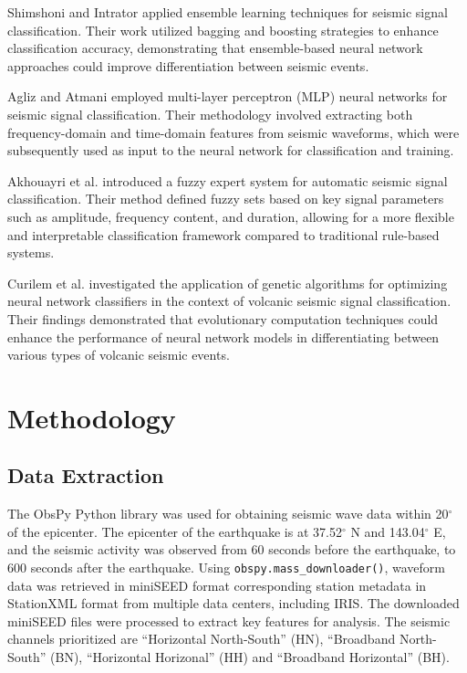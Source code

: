\documentclass[conference]{IEEEtran}
\begin{document}
Shimshoni and Intrator \cite{b7} applied
ensemble learning techniques for seismic signal classification. Their work
utilized bagging and boosting strategies to enhance classification accuracy,
demonstrating that ensemble-based neural network approaches could improve
differentiation between seismic events.


Agliz and Atmani \cite{b8} employed
multi-layer perceptron (MLP) neural networks for seismic signal classification.
Their methodology involved extracting both frequency-domain and time-domain
features from seismic waveforms, which were subsequently used as input to the
neural network for classification and training.


Akhouayri et al. \cite{b9}
introduced a fuzzy expert system for automatic seismic signal classification.
Their method defined fuzzy sets based on key signal parameters such as
amplitude, frequency content, and duration, allowing for a more flexible and
interpretable classification framework compared to traditional rule-based
systems.


Curilem et al. \cite{b10} investigated the application of genetic
algorithms for optimizing neural network classifiers in the context of volcanic
seismic signal classification. Their findings demonstrated that evolutionary
computation techniques could enhance the performance of neural network models in
differentiating between various types of volcanic seismic events.
\section{Methodology}
\label{sec:org78fd3e6}
\subsection{Data Extraction}
\label{sec:org4053090}
The ObsPy Python library was used for obtaining seismic wave data within
20\(^{\circ}\) of the epicenter. The epicenter of the earthquake is at
37.52\(^{\circ}\) N and 143.04\(^{\circ}\) E, and the seismic activity was
observed from 60 seconds before the earthquake, to 600 seconds after the
earthquake. Using \texttt{obspy.mass\_downloader()}, waveform data was retrieved
in miniSEED format corresponding station metadata in StationXML format from
multiple data centers, including IRIS. The downloaded miniSEED files were
processed to extract key features for analysis. The seismic channels prioritized
are ``Horizontal North-South'' (HN), ``Broadband North-South'' (BN), ``Horizontal
Horizonal'' (HH) and ``Broadband Horizontal'' (BH).
\end{document}
